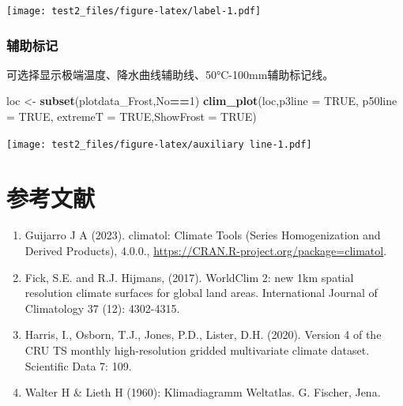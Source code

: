 \documentclass[
]{ctexart}
\newenvironment{Shaded}{\begin{snugshade}}{\end{snugshade}}
\newcommand{\AttributeTok}[1]{\textcolor[rgb]{0.13,0.29,0.53}{#1}}
\newcommand{\ConstantTok}[1]{\textcolor[rgb]{0.56,0.35,0.01}{#1}}
\newcommand{\DecValTok}[1]{\textcolor[rgb]{0.00,0.00,0.81}{#1}}
\newcommand{\FunctionTok}[1]{\textcolor[rgb]{0.13,0.29,0.53}{\textbf{#1}}}
\newcommand{\NormalTok}[1]{#1}
\newcommand{\OtherTok}[1]{\textcolor[rgb]{0.56,0.35,0.01}{#1}}
\newcommand{\SpecialCharTok}[1]{\textcolor[rgb]{0.81,0.36,0.00}{\textbf{#1}}}
\begin{document}
\texttt{[image: test2\_files/figure-latex/label-1.pdf]}

\hypertarget{ux8f85ux52a9ux6807ux8bb0}{%
\subsubsection{辅助标记}\label{ux8f85ux52a9ux6807ux8bb0}}

可选择显示极端温度、降水曲线辅助线、50°C-100mm辅助标记线。

\begin{Shaded}
\begin{Highlighting}[]
\NormalTok{loc }\OtherTok{\textless{}{-}} \FunctionTok{subset}\NormalTok{(plotdata\_Frost,No}\SpecialCharTok{==}\DecValTok{1}\NormalTok{)}
\FunctionTok{clim\_plot}\NormalTok{(loc,}\AttributeTok{p3line =} \ConstantTok{TRUE}\NormalTok{,}
          \AttributeTok{p50line =} \ConstantTok{TRUE}\NormalTok{,}
          \AttributeTok{extremeT =} \ConstantTok{TRUE}\NormalTok{,}\AttributeTok{ShowFrost =} \ConstantTok{TRUE}\NormalTok{)}
\end{Highlighting}
\end{Shaded}

\texttt{[image: test2\_files/figure-latex/auxiliary line-1.pdf]}

\hypertarget{ux53c2ux8003ux6587ux732e}{%
\section{参考文献}\label{ux53c2ux8003ux6587ux732e}}

\begin{enumerate}
\def\labelenumi{\arabic{enumi}.}
\item
  Guijarro J A (2023). climatol: Climate Tools (Series Homogenization
  and Derived Products), 4.0.0.,
  \url{https://CRAN.R-project.org/package=climatol}.
\item
  Fick, S.E. and R.J. Hijmans, (2017). WorldClim 2: new 1km spatial
  resolution climate surfaces for global land areas. International
  Journal of Climatology 37 (12): 4302-4315.
\item
  Harris, I., Osborn, T.J., Jones, P.D., Lister, D.H. (2020). Version 4
  of the CRU TS monthly high-resolution gridded multivariate climate
  dataset. Scientific Data 7: 109.
\item
  Walter H \& Lieth H (1960): Klimadiagramm Weltatlas. G. Fischer, Jena.
\end{enumerate}
\end{document}

